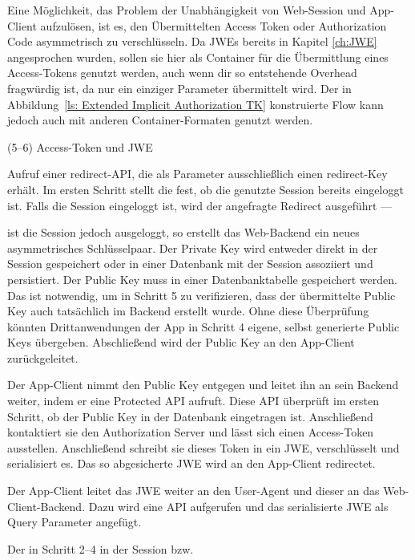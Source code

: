 Eine Möglichkeit, das Problem der Unabhängigkeit von Web-Session und App-Client
aufzulösen, ist es, den Übermittelten Access Token oder Authorization Code
asymmetrisch zu verschlüsseln. Da JWEs bereits in Kapitel \ref{ch:JWE}
angesprochen wurden, sollen sie hier als Container für die Übermittlung eines
Access-Tokens genutzt werden, auch wenn dir so entstehende Overhead fragwürdig
ist, da nur ein einziger Parameter übermittelt wird. Der in
Abbildung~\ref{ls: Extended Implicit Authorization TK} konstruierte Flow kann
jedoch auch mit anderen Container-Formaten genutzt werden.
\begin{labeling}{(5--6) Access-Token und JWE}
    \item [(1) propose/redirect] Aufruf einer
    redirect-API\label{wd:redirectApi}, die als Parameter ausschließlich einen
    redirect-Key erhält. Im ersten Schritt stellt die 
    fest, ob die genutzte Session bereits eingeloggt ist. Falls die Session
    eingeloggt ist, wird der angefragte Redirect ausgeführt ---
    \item[(2--4) Key proposal] ist die Session jedoch ausgeloggt, so erstellt
    das Web-Backend ein neues asymmetrisches Schlüsselpaar. Der Private Key wird
    entweder direkt in der Session gespeichert oder in einer Datenbank mit der
    Session assoziiert und persistiert. Der Public Key muss in einer
    Datenbanktabelle gespeichert werden. Das ist notwendig, um in Schritt 5 zu
    verifizieren, dass der übermittelte Public Key auch tatsächlich im Backend
    erstellt wurde. Ohne diese Überprüfung könnten Drittanwendungen der App in
    Schritt 4 eigene, selbst generierte Public Keys  übergeben. Abschließend
    wird der Public Key an den App-Client zurückgeleitet.
    \item[(5--6) Access-Token und JWE] Der App-Client nimmt den Public Key
    entgegen und leitet ihn an sein Backend weiter, indem er eine Protected API
    aufruft. Diese API überprüft im ersten Schritt, ob der Public Key in der
    Datenbank eingetragen ist. Anschließend kontaktiert sie den Authorization
    Server und lässt sich einen Access-Token ausstellen. Anschließend schreibt
    sie dieses Token in ein JWE, verschlüsselt und serialisiert es. Das so
    abgesicherte JWE wird an den App-Client redirectet.
    \item[(7--8) JWE Weiterleitung] Der App-Client leitet das JWE weiter an
    den User-Agent und dieser an das Web-Client-Backend. Dazu wird eine
    API aufgerufen und das serialisierte JWE als Query Parameter angefügt.
    \item[(9) JWE Entschlüsselung] Der in Schritt 2--4 in der Session bzw.\

\end{labeling}
